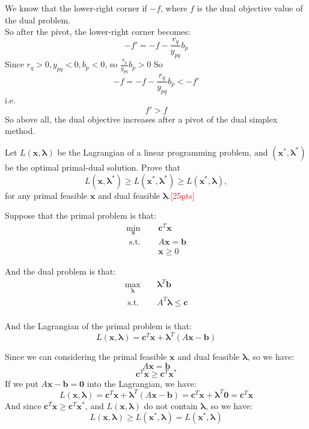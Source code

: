 \documentclass[10pt]{article}
\newenvironment{problem}[2][Problem]{\begin{trivlist}
\item[\hskip \labelsep {\bfseries #1}\hskip \labelsep {\bfseries #2.}]}{\end{trivlist}}
\begin{document}
We know that the lower-right corner if $-f$, where $f$ is the dual objective value of the dual problem.\\
So after the pivot, the lower-right corner becomes:\\
$$-f'= -f - \frac{r_q}{y_{pq}}b_p$$
Since $r_q>0,y_{pq}<0,b_p<0$, so $\frac{r_q}{y_{pq}}b_p>0$
So
$$-f= -f - \frac{r_q}{y_{pq}}b_p < -f'$$
i.e.
$$f'>f$$
So above all, the dual objective increases after a pivot of the dual simplex method.\\

\newpage


\begin{problem}{3}
    Let $L(\bm{x}, \bm{\lambda})$ be the Lagrangian of a linear programming problem, and $(\bm{x}^*, \bm{\lambda}^*)$ be the optimal primal-dual solution. Prove that $$L(\bm{x}, \bm{\lambda}^*) \geq L(\bm{x}^*, \bm{\lambda}^*) \geq L(\bm{x}^*, \bm{\lambda}),$$ for any primal feasible $\bm{x}$ and dual feasible $\bm{\lambda}$.\textcolor{red}{[25pts]}
\end{problem}

Suppose that the primal problem is that:
\begin{equation}
\begin{aligned}
\min_{\bm{x}} \quad & \bm{c}^T\bm{x} \\
\text { s.t. } \quad & A\bm{x} = \bm{b} \\
& \bm{x} \geq 0
\end{aligned}
\end{equation}

And the dual problem is that:
\begin{equation}
\begin{aligned}
\max_{\bm{\lambda}} \quad & \bm{\lambda}^T\bm{b} \\
\text { s.t. } \quad & A^T\bm{\lambda} \leq \bm{c} \\
\end{aligned}
\end{equation}

And the Lagrangian of the primal problem is that:
$$L(\bm{x},\bm{\lambda}) = \bm{c}^T\bm{x} + \bm{\lambda}^T(A\bm{x} - \bm{b})$$

Since we can considering the primal feasible $\bm{x}$ and dual feasible $\bm{\lambda}$, so we have:
$$A\bm{x} = \bm{b}$$
$$\bm{c}^T\bm{x} \geq \bm{c}^T\bm{x}^*$$
If we put $A\bm{x} - \bm{b} = \bm{0}$ into the Lagrangian, we have:
$$L(\bm{x},\bm{\lambda}) = \bm{c}^T\bm{x} + \bm{\lambda}^T(A\bm{x} - \bm{b}) = \bm{c}^T\bm{x} + \bm{\lambda}^T\bm{0} = \bm{c}^T\bm{x}$$
And since $\bm{c}^T\bm{x} \geq \bm{c}^T\bm{x}^*$, and $L(\bm{x},\bm{\lambda})$ do not contain $\bm{\lambda}$, so we have:
$$L(\bm{x},\bm{\lambda}) \geq L(\bm{x}^*,\bm{\lambda}) = L(\bm{x}^*,\bm{\lambda})$$
\end{document}
